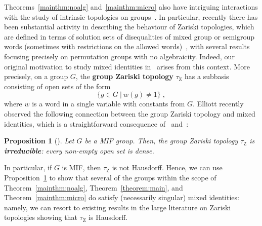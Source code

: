\documentclass{article}
\newtheorem{prop}[theorem]{Proposition}
\theoremstyle{remark}
\theoremstyle{definition}
\newcommand{\repau}[1]{\textcolor{ForestGreen}{PM: #1}}
\DeclareMathOperator{\Homeo}{Homeo}
\DeclareMathOperator{\ZZ}{Z}
\newcommand{\zar}{\tau_{\ZZ}}
\begin{document}
{%

Theorems~\ref{mainthm:noalg} and~\ref{mainthm:micro} also %
have intriguing interactions with the study of intrinsic topologies on groups~\cite{markov1946unconditionally, bryant1977verbal}. In particular, recently there has been substantial activity in describing the behaviour of  Zariski topologies, which are defined in terms of solution sets of disequalities of mixed group or semigroup words (sometimes with restrictions on the allowed words)~\cite{bryant1977verbal, banakh2012algebraically, bardyla2025note, ghadernezhad2019group, pinsker2026zariski, elliott2023automatic,elliott2026zariskitopologyhomeomorphismgroups, gonzalez2026minimal},  with several results focusing precisely on {permutation} groups with no  algebraicity. Indeed, our original motivation to study mixed identities in~\cite{gonzalez2026minimal} arises from this context. More precisely, on a group $G$, the \textbf{group Zariski topology} $\zar$ has a subbasis 
consisting of 
open sets of the form 
\[\{g\in G\ \vert \ w(g)\neq 1\}\;,\]
  where $w$ is a word in a single variable with constants from $G$. Elliott recently observed the following connection between the group Zariski topology and mixed identities, which is a straightforward consequence of~\cite[Lemma 3.1]{elliott2026zariskitopologyhomeomorphismgroups} and~\cite[Proposition 6.18 (i)]{etedadialiabadi2021dense}:
  \begin{prop}[\cite{elliottprivate}]\label{prop:elliott} Let $G$ be a MIF group. Then, the group Zariski topology $\zar$ is \textbf{irreducible}: every non-empty open set is dense. 
  \end{prop}
In particular, if $G$ is MIF, then $\zar$ is not Hausdorff. Hence, we can use Proposition~\ref{prop:elliott} to show that several of the groups within the scope of  {Theorem~\ref{mainthm:noalg}, Theorem~\ref{theorem:main}, and Theorem~\ref{mainthm:micro}}
do satisfy  (necessarily singular) mixed identities: namely, we can resort to existing results in the large literature on Zariski topologies showing that $\zar$ is Hausdorff.


}
\end{document}
